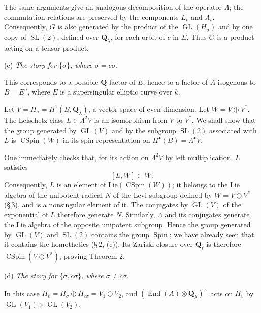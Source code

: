 \documentclass[11pt,a4paper]{article}
\theoremstyle{plain}
\theoremstyle{definition}
\DeclareMathOperator{\End}{End}
\DeclareMathOperator{\CSpin}{CSpin}
\DeclareMathOperator{\SL}{SL}
\DeclareMathOperator{\GL}{GL}
\DeclareMathOperator{\Spin}{Spin}
\begin{document}
The same arguments give an analogous decomposition of the operator $\Lambda$; the commutation relations are preserved by the components $L_v$ and $\Lambda_v$. Consequently, $G$ is also generated by the product of the $\GL(H_\sigma)$ and by one copy of $\SL(2)$, defined over $\mathbf{Q}_\lambda$, for each orbit of $c$ in $\Sigma$. Thus $G$ is a product acting on a tensor product.

(c) \textit{The story for $\{\sigma\}$, where $\sigma = c\sigma$.}

This corresponds to a possible $\mathbf{Q}$-factor of $E$, hence to a factor of $A$ isogenous to $B = E^n$, where $E$ is a supersingular elliptic curve over $k$.

Let $V = H_\sigma = H^1(B, \mathbf{Q}_\lambda)$, a vector space of even dimension. Let $W = V \oplus V^*$. The Lefschetz class $L \in \Lambda^2 V$ is an isomorphism from $V$ to $V^*$. We shall show that the group generated by $\GL(V)$ and by the subgroup $\SL(2)$ associated with $L$ is $\CSpin(W)$ in its spin representation on $H^\bullet(B) = \Lambda^\bullet V$.

One immediately checks that, for its action on $\Lambda^2 V$ by left multiplication, $L$ satisfies
\[
[L, W] \subset W .
\]
Consequently, $L$ is an element of $\mathrm{Lie}(\CSpin(W))$; it belongs to the Lie algebra of the unipotent radical $N$ of the Levi subgroup defined by $W = V \oplus V^*$ (\S\,3), and is a nonsingular element of it. The conjugates by $\GL(V)$ of the exponential of $L$ therefore generate $N$. Similarly, $\Lambda$ and its conjugates generate the Lie algebra of the opposite unipotent subgroup. Hence the group generated by $\GL(V)$ and $\SL(2)$ contains the group $\Spin$; we have already seen that it contains the homotheties (\S\,2, (c)). Its Zariski closure over $\mathbf{Q}_\ell$ is therefore $\CSpin(V \oplus V^*)$, proving Theorem 2.

(d) \textit{The story for $\{\sigma, c\sigma\}$, where $\sigma \neq c\sigma$.}

In this case $H_v = H_\sigma \oplus H_{c\sigma} = V_1 \oplus V_2$, and $(\End(A) \otimes \mathbf{Q}_\lambda)^\times$ acts on $H_v$ by $\GL(V_1) \times \GL(V_2)$.
\end{document}
